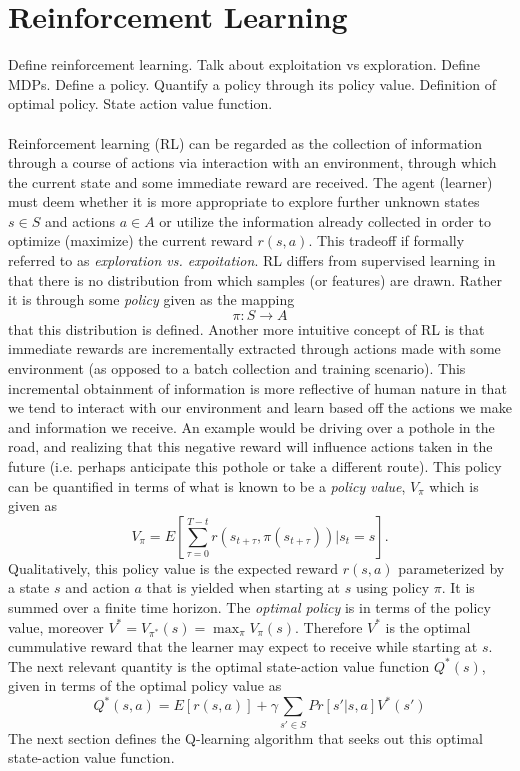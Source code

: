 \documentclass{article} %
\begin{document}
\section{Reinforcement Learning}
Define reinforcement learning. Talk about exploitation vs exploration.  Define MDPs. Define a policy.  Quantify a policy through its policy value. Definition of optimal policy. State action value function.
\\
\\
Reinforcement learning (RL) can be regarded as the collection of information through a course of actions via interaction with an environment, through which the current state and some immediate reward are received. The agent (learner) must deem whether it is more appropriate to explore further unknown states $s \in S$ and actions $a \in A$ or utilize the information already collected in order to optimize (maximize) the current reward $r(s,a)$. This tradeoff if formally referred to as \textit{exploration vs. expoitation}. RL differs from supervised learning in that there is no distribution from which samples (or features) are drawn. Rather it is through some \textit{policy} given as the mapping
$$
\pi : S \rightarrow A
$$
that this distribution is defined. Another more intuitive concept of RL is that immediate rewards are incrementally extracted through actions made with some environment (as opposed to a batch collection and training scenario). This incremental obtainment of information is more reflective of human nature in that we tend to interact with our environment and learn based off the actions we make and information we receive. An example would be driving over a pothole in the road, and realizing that this negative reward will influence actions taken in the future (i.e. perhaps anticipate this pothole or take a different route). This policy can be quantified in terms of what is known to be a \textit{policy value}, $V_{\pi}$ which is given as 
$$
V_{\pi} = E[\sum_{\tau = 0}^{T-t}r(s_{t+\tau},\pi(s_{t+\tau}))|s_t = s].
$$
Qualitatively, this policy value is the expected reward $r(s,a)$ parameterized by a state $s$ and action $a$ that is yielded when starting at $s$ using policy $\pi$. It is summed over a finite time horizon. The \textit{optimal policy} is in terms of the policy value, moreover $V^{*}=V_{\pi^*}(s) = \max_{\pi} V_{\pi}(s)$. Therefore $V^{*}$ is the optimal cummulative reward that the learner may expect to receive while starting at $s$. The next relevant quantity is the optimal state-action value function $Q^*(s)$, given in terms of the optimal policy value as
$$
Q^*(s,a) = E[r(s,a)] + \gamma \sum_{s' \in S}Pr[s' | s,a]V^*(s')
$$
The next section defines the Q-learning algorithm that seeks out this optimal state-action value function. 
\end{document}
